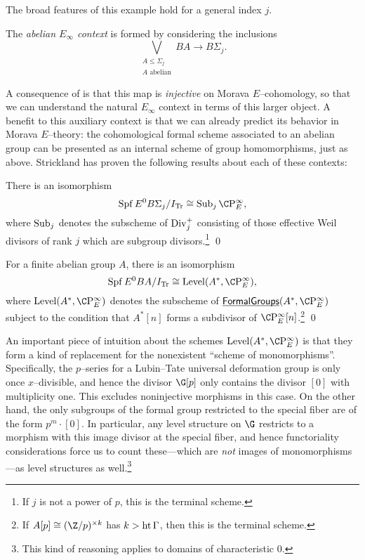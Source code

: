 The broad features of this example hold for a general index $j$.
\begin{definition}
The \textit{abelian $E_\infty$ context} is formed by considering the inclusions \[\bigvee_{\substack{A \le \Sigma_j \\ \text{$A$ abelian}}} BA \to B\Sigma_j.\]
\end{definition}
\noindent A consequence of  is that this map is \emph{injective} on Morava $E$--cohomology, so that we can understand the natural $E_\infty$ context in terms of this larger object.  A benefit to this auxiliary context is that we can already predict its behavior in Morava $E$--theory: the cohomological formal scheme associated to an abelian group can be presented as an internal scheme of group homomorphisms, just as above.  Strickland has proven the following results about each of these contexts:

\begin{theorem}
There is an isomorphism \[\Spf E^0 B\Sigma_j / I_{\Tr} \cong \Sub_j \CP^\infty_E,\] where $\operatorname{Sub}_j$ denotes the subscheme of $\operatorname{Div}_j^+$ consisting of those effective Weil divisors of rank $j$ which are subgroup divisors.\footnote{If $j$ is not a power of $p$, this is the terminal scheme.} \qed
\end{theorem}

\begin{theorem}
For a finite abelian group $A$, there is an isomorphism \[\Spf E^0 BA / I_{\Tr} \cong \Level(A^*, \CP^\infty_E),\] where $\Level(A^*, \CP^\infty_E)$ denotes the subscheme of $\InternalHom{FormalGroups}(A^*, \CP^\infty_E)$ subject to the condition that $A^*[n]$ forms a subdivisor of $\CP^\infty_E[n]$.\footnote{If $A[p] \cong (\Z/p)^{\times k}$ has $k > \operatorname{ht}{\Gamma}$, then this is the terminal scheme.}  \qed
\end{theorem}

\begin{remark}
An important piece of intuition about the schemes $\Level(A^*, \CP^\infty_E)$ is that they form a kind of replacement for the nonexistent ``scheme of monomorphisms''.  Specifically, the $p$--series for a Lubin--Tate universal deformation group is only once $x$--divisible, and hence the divisor $\G[p]$ only contains the divisor $[0]$ with multiplicity one.  This excludes noninjective morphisms in this case.  On the other hand, the only subgroups of the formal group restricted to the special fiber are of the form $p^m \cdot [0]$.  In particular, any level structure on $\G$ restricts to a morphism with this image divisor at the special fiber, and hence functoriality considerations force us to count these---which are \emph{not} images of monomorphisms---as level structures as well.\footnote{This kind of reasoning applies to domains of characteristic $0$.}
\end{remark}

